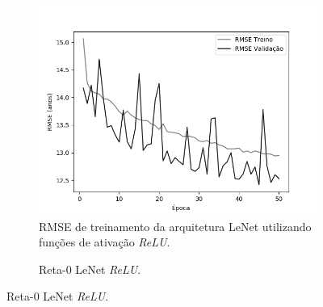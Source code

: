 
	\begin{figure}[hb!]
		\caption{Resultados do treinamento e teste da CNN LeNet.}\label{fig:lenet-abordagem1}
		\begin{subfigure}[hb]{0.5\linewidth}
			\caption{RMSE de treinamento da arquitetura LeNet utilizando funções de ativação \emph{ReLU}.}
			\label{fig:redeneuralbiologica}
			\includegraphics[width=\linewidth]{img/graficos/history/lenet/fig-history-image-treat-3-lenet-relu-rmse.png}%
		\end{subfigure}%
		\begin{subfigure}[hb]{0.5\linewidth}
			\caption{Reta-0 LeNet \emph{ReLU}.}
			\label{fig:redeneuralbiologica}

\end{subfigure}
\end{figure}
